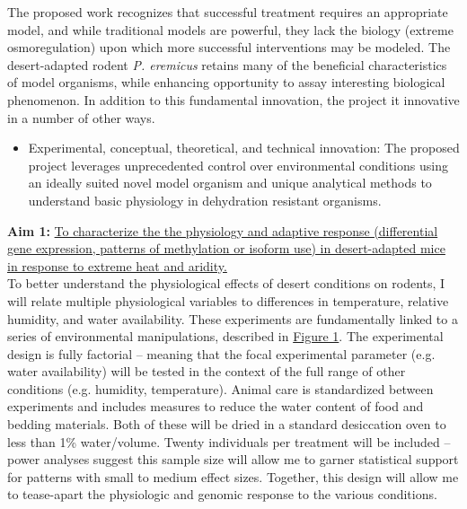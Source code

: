 \documentclass[11pt]{article}
\begin{document}
The proposed work recognizes that successful treatment requires an appropriate model, and while traditional models are powerful, they lack the biology (extreme osmoregulation) upon which more successful interventions may be modeled. The desert-adapted rodent \textit{P. eremicus} retains many of the beneficial characteristics of model organisms, while enhancing opportunity to assay interesting biological phenomenon. In addition to this fundamental innovation, the project it innovative in a number of other ways.
\begin{itemize}
\item Experimental, conceptual, theoretical, and technical innovation: The proposed project leverages unprecedented control over environmental conditions using an ideally suited novel model organism and unique analytical methods to understand basic physiology in dehydration resistant organisms.

\end{itemize}

 

\newpage

\linespread{1.2}

\noindent \textbf{Aim 1:} \ul{To characterize the the physiology and adaptive response (differential gene expression, patterns of methylation or isoform use) in desert-adapted mice in response to extreme heat and aridity.} \\

To better understand the physiological effects of desert conditions on rodents, I will relate multiple physiological variables to differences in temperature, relative humidity, and water availability. These experiments are fundamentally linked to a series of environmental manipulations, described in \hyperlink{Figure 1}{Figure 1}. The experimental design is fully factorial -- meaning that the focal experimental parameter (e.g. water availability) will be tested in the context of the full range of other conditions (e.g. humidity, temperature). Animal care is standardized between experiments and includes measures to reduce the water content of food and bedding materials. Both of these will be dried in a standard desiccation oven to less than 1\% water/volume. Twenty individuals per treatment will be included -- power analyses suggest this sample size will allow me to garner statistical support for patterns with small to medium effect sizes. Together, this design will allow me to tease-apart the physiologic and genomic response to the various conditions. \\
\end{document}
